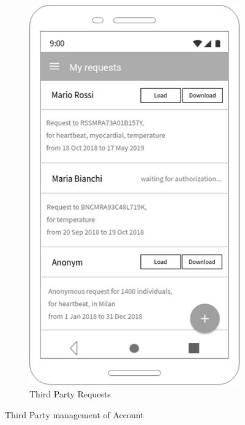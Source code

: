 \begin{figure}[h!]
\begin{subfigure}[b]{0.25\linewidth}
    \includegraphics[width=\linewidth]{img/mockup/tp_requests.jpg}

    \caption{Third Party Requests}

  \end{subfigure}

\caption{Third Party management of Account }

 \end{figure}

\clearpage

